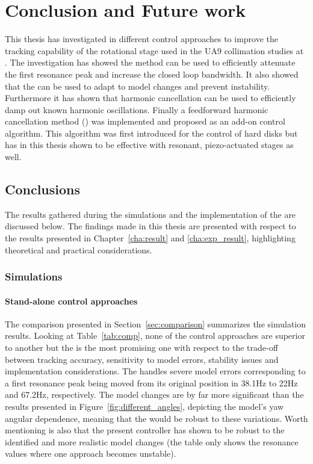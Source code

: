 \chapter{Conclusion and Future work}\label{cha:conclusion}
This thesis has investigated in different control approaches to improve the tracking capability of the rotational stage used in the UA9 collimation studies at \abbrCERN. The investigation has showed the \abbrIRC method can be used to efficiently attenuate the first resonance peak and increase the closed loop bandwidth. It also showed that the \abbrMRACPE can be used to adapt to model changes and prevent instability. Furthermore it has shown that harmonic cancellation can be used to efficiently damp out known harmonic oscillations. Finally a feedforward harmonic cancellation method (\abbrRFDC) was implemented and proposed as an add-on control algorithm. This algorithm was first introduced for the control of hard disks but has in this thesis shown to be effective with resonant, piezo-actuated stages as well.

\section{Conclusions}
The results gathered during the simulations and the implementation of the \abbrRFDC are discussed below. The findings made in this thesis are presented with respect to the results presented in Chapter~\ref{cha:result} and \ref{cha:exp_result}, highlighting theoretical and practical considerations.

\subsection{Simulations}
\subsubsection{Stand-alone control approaches}
The comparison presented in Section~\ref{sec:comparison} summarizes the simulation results. Looking at Table~\ref{tab:comp}, none of the control approaches are superior to another but the \abbrIRC is the most promising one with respect to the trade-off between tracking accuracy, sensitivity to model errors, stability issues and implementation considerations. The \abbrIRC handles severe model errors corresponding to a first resonance peak being moved from its original position in 38.1Hz to 22Hz and 67.2Hz, respectively. The model changes are by far more significant than the results presented in Figure~\ref{fig:different_angles}, depicting the model's yaw angular dependence, meaning that the \abbrIRC would be robust to these variations. Worth mentioning is also that the present controller has shown to be robust to the identified and more realistic model changes (the table only shows the resonance values where one approach becomes unstable).

